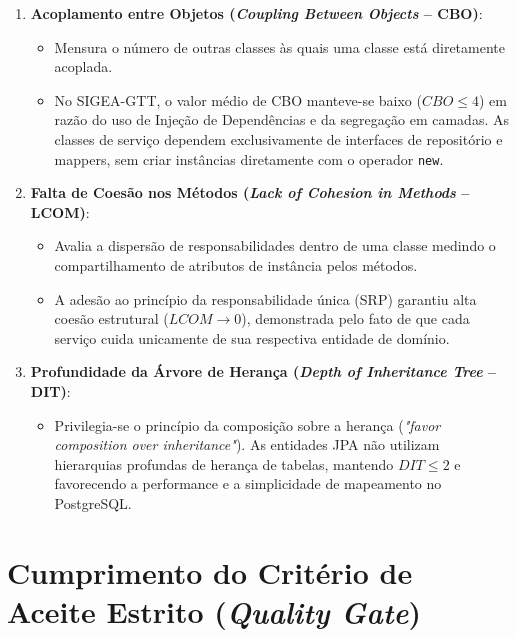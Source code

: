 \begin{enumerate}
    \item \textbf{Acoplamento entre Objetos (\textit{Coupling Between Objects} -- CBO)}:
    \begin{itemize}
        \item Mensura o número de outras classes às quais uma classe está diretamente acoplada.
        \item No SIGEA-GTT, o valor médio de CBO manteve-se baixo ($CBO \le 4$) em razão do uso de Injeção de Dependências e da segregação em camadas. As classes de serviço dependem exclusivamente de interfaces de repositório e mappers, sem criar instâncias diretamente com o operador \texttt{new}.
    \end{itemize}

    \item \textbf{Falta de Coesão nos Métodos (\textit{Lack of Cohesion in Methods} -- LCOM)}:
    \begin{itemize}
        \item Avalia a dispersão de responsabilidades dentro de uma classe medindo o compartilhamento de atributos de instância pelos métodos.
        \item A adesão ao princípio da responsabilidade única (SRP) garantiu alta coesão estrutural ($LCOM \to 0$), demonstrada pelo fato de que cada serviço cuida unicamente de sua respectiva entidade de domínio.
    \end{itemize}

    \item \textbf{Profundidade da Árvore de Herança (\textit{Depth of Inheritance Tree} -- DIT)}:
    \begin{itemize}
        \item Privilegia-se o princípio da composição sobre a herança (\textit{"favor composition over inheritance"}). As entidades JPA não utilizam hierarquias profundas de herança de tabelas, mantendo $DIT \le 2$ e favorecendo a performance e a simplicidade de mapeamento no PostgreSQL.
    \end{itemize}
\end{enumerate}

\section{Cumprimento do Critério de Aceite Estrito (\textit{Quality Gate})}
\label{sec_quality_gate}

